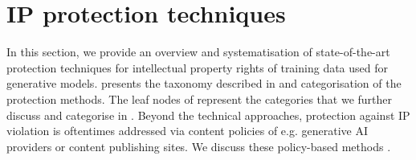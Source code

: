 \documentclass[conference]{IEEEtran}
\begin{document}


\section{IP protection techniques}\label{sec:mitigation}
In this section, we provide an overview and systematisation of state-of-the-art protection techniques for intellectual property rights of training data used for generative models.
 presents the taxonomy described in  and categorisation of the protection methods.
The leaf nodes of  represent the categories that we further discuss and categorise in .
Beyond the technical approaches, protection against IP violation is oftentimes addressed via content policies of e.g. generative AI providers or content publishing sites. 
We discuss these policy-based methods .
\end{document}
